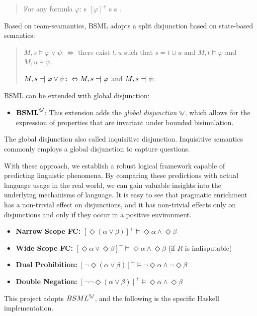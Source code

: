 \begin{quote}
For any formula \( \varphi \): s \models $[\varphi]^+$ \quad {} \quad s \models \varphi {} s \neq \emptyset.
\end{quote}

 Based on team-seamantics, BSML adopts a split disjunction based on state-based semantics:

\begin{quote}
    $M, s \models \varphi \vee \psi \colon \Leftrightarrow$ there exist $t, u$ such that $s = t \cup u$ and $M, t \models \varphi$ and $M, u \models \psi$.
    
    $M, s \leftmodels \varphi \vee \psi \colon \Leftrightarrow M, s \leftmodels \varphi$ and $M, s \leftmodels \psi$.
\end{quote}


BSML can be extended with global disjunction:
\begin{itemize}
    \item \(\textbf{BSML}^{\inqdisj}\): This extension adds the \textit{global disjunction} \(\inqdisj\), which allows for the expression of properties that are invariant under bounded bisimulation.
\end{itemize}

The global disjunction also called inquisitive disjunction. 
Inquisitive semantics commonly employs a global disjunction to capture questions. 


With these approach, we establish a robust logical framework capable of predicting linguistic phenomena. 
By comparing these predictions with actual language usage in the real world, we can gain valuable insights into the underlying mechanisms of language.
It is easy to see that pragmatic enrichment has a non-trivial effect on disjunctions, 
and it has non-trivial effects only on disjunctions and only if they occur in a positive environment.  

\begin{itemize}
    \item \textbf{Narrow Scope FC:} \quad ${[ \Diamond (\alpha \lor \beta) ]}^+ \models \Diamond \alpha \land \Diamond \beta$
    \item \textbf{Wide Scope FC:} \quad ${[\Diamond \alpha \lor \Diamond \beta]}^+ \models \Diamond \alpha \land \Diamond \beta$ 
          \quad (if $R$ is indisputable)
    \item \textbf{Dual Prohibition:} \quad ${[\neg \Diamond (\alpha \lor \beta)]}^+ \models \neg \Diamond \alpha \land \neg \Diamond \beta$
    \item \textbf{Double Negation:} \quad ${[\neg \neg \Diamond (\alpha \lor \beta)]}^+ \models \Diamond \alpha \land \Diamond \beta$
 \end{itemize}
 
 This project adopts $BSML^{\inqdisj}$, and the following is the specific Haskell implementation.
   